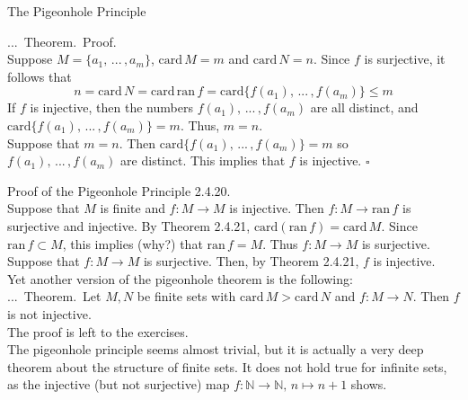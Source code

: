 \documentclass[smaller,hyperref={CJKbookmarks=true}]{beamer}
\newcommand{\N}{\mathbb{N}} \newcommand{\Z}{\mathbb{Z}} \newcommand{\Q}{\mathbb{Q}}
\newenvironment{PROOF}{{\noindent\!\sf\alert{Proof.}}\\}{\hfill$\square$\\}
\newcounter{zhuo}[subsection]
\renewcommand{\thezhuo}{\thesection.\thesubsection.\arabic{zhuo}}
\newenvironment{THEOREM}{\stepcounter{zhuo}\alert{\thezhuo.~Theorem.\,}}{}
\begin{document}
\begin{frame}{The Pigeonhole Principle}
\begin{spacing}{1}
\begin{THEOREM}
\end{THEOREM}
\begin{PROOF}
Suppose $M=\{a_1,\,...\,,a_m\}$, $\text{card}\,M=m$ and $\text{card}\,N=n$. Since $f$ is surjective, it follows that
\[n=\text{card}\,N=\text{card}\,\text{ran}\,f=\text{card}
\{f(a_1),\,...\,,f(a_m)\}\leq m\]
If $f$ is injective, then the numbers $f(a_1),\,...\,,f(a_m)$ are all distinct, and $\text{card}\{f(a_1),\,...\,,f(a_m)\}=m$. Thus, $m=n$.\\[5pt]
Suppose that $m=n$. Then $\text{card}\{f(a_1),\,...\,,f(a_m)\}=m$ so $f(a_1),\,...\,,f(a_m)$ are distinct. This implies that $f$ is injective.
\end{PROOF}
\end{spacing}
\newpage
\begin{spacing}{1.15}
\alert{Proof of the Pigeonhole Principle 2.4.20.}\\
Suppose that $M$ is finite and $f:M\to M$ is injective. Then $f:M\to\text{ran}\,f$ is surjective and injective. By Theorem 2.4.21, $\text{card}(\text{ran}\,f)=\text{card}\,M$. Since $\text{ran}\,f\subset M$, this implies (why?) that $\text{ran}\,f=M$. Thus $f:M\to M$ is surjective.\\[5pt]
Suppose that $f:M\to M$ is surjective. Then, by Theorem 2.4.21, $f$ is injective.\\[5pt]
Yet another version of the pigeonhole theorem is the following:\\[5pt]
\begin{THEOREM}
Let $M,N$ be finite sets with $\text{card}\,M>\text{card}\,N$ and $f:M\to N$. Then $f$ is not injective.\\[5pt]
\end{THEOREM}
The proof is left to the exercises.\\[5pt]
The pigeonhole principle seems almost trivial, but it is actually a very deep
theorem about the structure of finite sets. It does not hold true for infinite
sets, as the injective (but not surjective) map $f:\N\to\N,\,n\mapsto n+1$ shows.
\end{spacing}
\end{frame}
\end{document}
